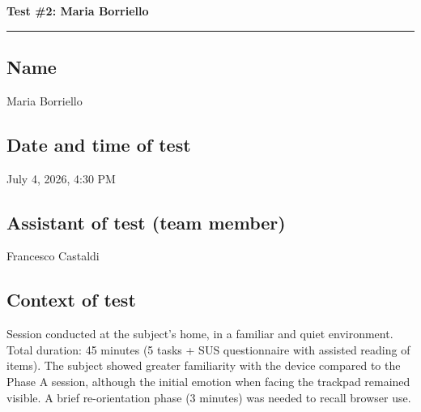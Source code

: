 ﻿\documentclass[11pt,a4paper]{article}
\begin{document}

\newpage
\begin{center}
  {\color{primaryColor}\large\bfseries Test \#2: Maria Borriello}\\
  \vspace{0.1cm}
  \color{borderColor}\hrule
\end{center}

\vspace{0.5cm}

\subsection*{Name}
\begin{tcolorbox}[base]
Maria Borriello
\end{tcolorbox}

\subsection*{Date and time of test}
\begin{tcolorbox}[base]
July 4, 2026, 4:30 PM
\end{tcolorbox}

\subsection*{Assistant of test (team member)}
\begin{tcolorbox}[base]
Francesco Castaldi
\end{tcolorbox}

\subsection*{Context of test}
\begin{tcolorbox}[base]
Session conducted at the subject's home, in a
familiar and quiet environment. Total duration: 45 minutes
(5 tasks + SUS questionnaire with assisted reading of items).
The subject showed greater familiarity with the device
compared to the Phase A session, although the initial emotion
when facing the trackpad remained visible. A brief
re-orientation phase (3 minutes) was needed to recall browser use.
\end{tcolorbox}
\end{document}
